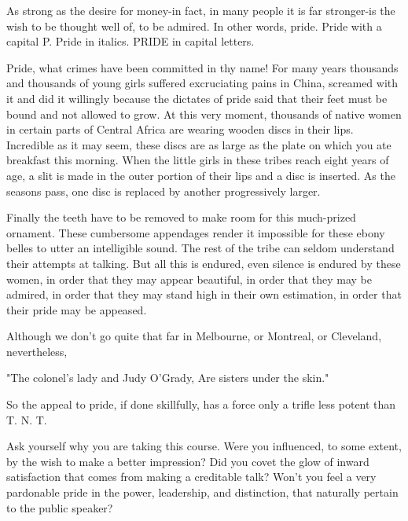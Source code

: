 \documentclass[10pt]{article}
\begin{document}
As strong as the desire for money-in fact, in many people it is far stronger-is the wish to be thought well of, to be admired. In other words, pride. Pride with a capital P. Pride in italics. PRIDE in capital letters.

Pride, what crimes have been committed in thy name! For many years thousands and thousands of young girls suffered excruciating pains in China, screamed with it and did it willingly because the dictates of pride said that their feet must be bound and not allowed to grow. At this very moment, thousands of native women in certain parts of Central Africa are wearing wooden discs in their lips. Incredible as it may seem, these discs are as large as the plate on which you ate breakfast this morning. When the little girls in these tribes reach eight years of age, a slit is made in the outer portion of their lips and a disc is inserted. As the seasons pass, one disc is replaced by another progressively larger.

Finally the teeth have to be removed to make room for this much-prized ornament. These cumbersome appendages render it impossible for these ebony belles to utter an intelligible sound. The rest of the tribe can seldom understand their attempts at talking. But all this is endured, even silence is endured by these women, in order that they may appear beautiful, in order that they may be admired, in order that they may stand high in their own estimation, in order that their pride may be appeased.

Although we don't go quite that far in Melbourne, or Montreal, or Cleveland, nevertheless,

\begin{displayquote}
"The colonel's lady and Judy O'Grady, Are sisters under the skin."
\end{displayquote}

So the appeal to pride, if done skillfully, has a force only a trifle less potent than T. N. T.

Ask yourself why you are taking this course. Were you influenced, to some extent, by the wish to make a better impression? Did you covet the glow of inward satisfaction that comes from making a creditable talk? Won't you feel a very pardonable pride in the power, leadership, and distinction, that naturally pertain to the public speaker?
\end{document}

